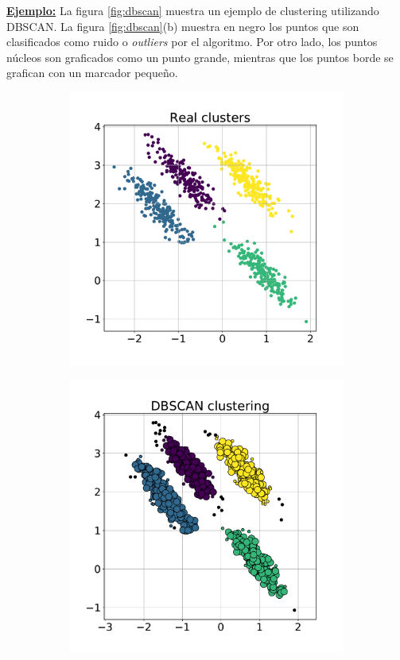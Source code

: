 \underline{\textbf{Ejemplo:}} La figura \ref{fig:dbscan} muestra un ejemplo de clustering utilizando DBSCAN. La figura \ref{fig:dbscan}(b) muestra en negro los puntos que son clasificados como ruido o \emph{outliers} por el algoritmo. Por otro lado, los puntos núcleos son graficados como un punto grande, mientras que los puntos borde se grafican con un marcador pequeño.
\begin{figure}[ht]
    \centering
    \begin{subfigure}[t]{0.5\linewidth}
        \centering
        \includegraphics[width=\linewidth]{img/real_clusters.pdf}
        \caption{}
    \end{subfigure}%
    \begin{subfigure}[t]{0.5\linewidth}
        \centering
        \includegraphics[width=\linewidth]{img/dbscan.pdf}

\end{subfigure}
\end{figure}
